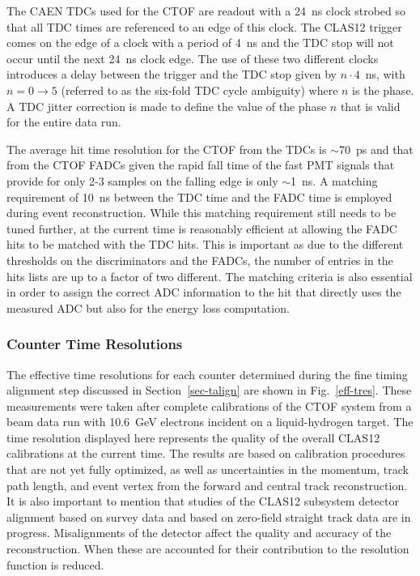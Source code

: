 \documentclass{elsart}
\begin{document}
The CAEN TDCs used for the CTOF are readout with a 24~ns clock strobed so that all TDC times are
referenced to an edge of this clock. The CLAS12 trigger comes on the edge of a clock with a period of
4~ns and the TDC stop will not occur until the next 24~ns clock edge. The use of these two different
clocks introduces a delay between the trigger and the TDC stop given by $n \cdot 4$~ns, with
$n = 0 \to 5$ (referred to as the six-fold TDC cycle ambiguity) where $n$ is the phase. A TDC jitter
correction is made to define the value of the phase $n$ that is valid for the entire data run.

The average hit time resolution for the CTOF from the TDCs is $\sim$70~ps and that from the CTOF
FADCs given the rapid fall time of the fast PMT signals that provide for only 2-3 samples on the falling
edge is only $\sim$1~ns. A matching requirement of 10~ns between the TDC time and the FADC time is
employed during event reconstruction. While this matching requirement still needs to be tuned further,
at the current time is reasonably efficient at allowing the FADC hits to be matched with the TDC hits.
This is important as due to the different thresholds on the discriminators and the FADCs, the number
of entries in the hits lists are up to a factor of two different. The matching criteria is also essential
in order to assign the correct ADC information to the hit that directly uses the measured ADC but also
for the energy loss computation.

\subsubsection{Counter Time Resolutions}
\label{tres-beam}

The effective time resolutions for each counter determined during the fine timing alignment step
discussed in Section~\ref{sec-talign} are shown in Fig.~\ref{eff-tres}. These measurements were
taken after complete calibrations of the CTOF system from a beam data run with 10.6~GeV electrons
incident on a liquid-hydrogen target. The time resolution displayed here represents the quality of the
overall CLAS12 calibrations at the current time. The results are based on calibration procedures that
are not yet fully optimized, as well as uncertainties in the momentum, track path length, and event vertex
from the forward and central track reconstruction. It is also important to mention that studies of the
CLAS12 subsystem detector alignment based on survey data and based on zero-field straight track data
are in progress. Misalignments of the detector affect the quality and accuracy of the reconstruction.
When these are accounted for their contribution to the resolution function is reduced.
\end{document}
